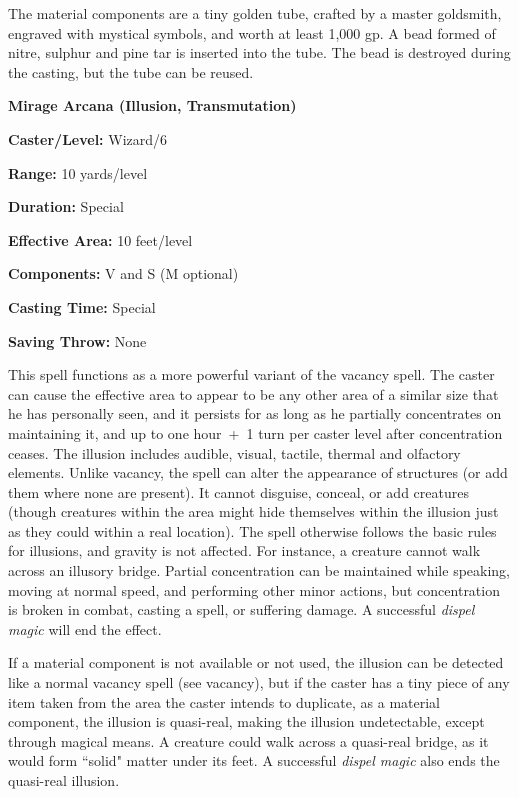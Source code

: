 \begin{multicols}{2}
The material components are a tiny golden tube, crafted by a master goldsmith, engraved with mystical symbols, and worth at least 1,000 gp. A bead formed of nitre, sulphur and pine tar is inserted into the tube.  The bead is destroyed during the casting, but the tube can be reused.  

\vspace{1em}

\noindent
\begin{minipage}{\columnwidth}

\noindent \textbf{Mirage Arcana (Illusion, Transmutation)}

\noindent \textbf{Caster/Level:} Wizard/6

\noindent \textbf{Range:} 10 yards/level

\noindent \textbf{Duration:} Special

\noindent \textbf{Effective Area:} 10 feet/level

\noindent \textbf{Components:} V and S (M optional)

\noindent \textbf{Casting Time:} Special

\noindent \textbf{Saving Throw:} None

\end{minipage}

This spell functions as a more powerful variant of the vacancy spell.  The caster can cause the effective area to appear to be any other area of a similar size that he has personally seen, and it persists for as long as he partially concentrates on maintaining it, and up to one hour~+~1 turn per caster level after concentration ceases.  The illusion includes audible, visual, tactile, thermal and olfactory elements.  Unlike vacancy, the spell can alter the appearance of structures (or add them where none are present).  It cannot disguise, conceal, or add creatures (though creatures within the area might hide themselves within the illusion just as they could within a real location).  The spell otherwise follows the basic rules for illusions, and gravity is not affected.  For instance, a creature cannot walk across an illusory bridge.  Partial concentration can be maintained while speaking, moving at normal speed, and performing other minor actions, but concentration is broken in combat, casting a spell, or suffering damage.  A successful \textit{dispel magic} will end the effect.

If a material component is not available or not used, the illusion can be detected like a normal vacancy spell (see vacancy), but if the caster has a tiny piece of any item taken from the area the caster intends to duplicate, as a material component, the illusion is quasi-real, making the illusion undetectable, except through magical means.  A creature could walk across a quasi-real bridge, as it would form ``solid" matter under its feet.  A successful \textit{dispel magic} also ends the quasi-real illusion.


\end{multicols}
